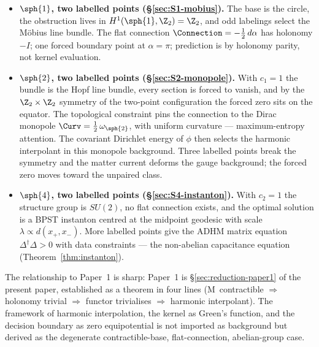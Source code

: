 \begin{itemize}[leftmargin=2em]
\item \textbf{$\sph{1}$, two labelled points (\S\ref{sec:S1-mobius}).}
The base is the circle, the obstruction lives in $H^1(\sph{1},\Z_2)=\Z_2$,
and odd labelings select the M\"obius line bundle. The flat connection
$\Connection = -\tfrac12\,d\alpha$ has holonomy $-I$; one forced
boundary point at $\alpha=\pi$; prediction is by holonomy parity, not
kernel evaluation.

\item \textbf{$\sph{2}$, two labelled points (\S\ref{sec:S2-monopole}).}
With $c_1=1$ the bundle is the Hopf line bundle, every section is
forced to vanish, and by the $\Z_2\times\Z_2$ symmetry of the
two-point configuration the forced zero sits on the equator. The
topological constraint pins the connection to the Dirac monopole
$\Curv = \tfrac12\,\omega_{\sph{2}}$, with uniform curvature ---
maximum-entropy attention. The covariant Dirichlet energy of $\phi$
then selects the harmonic interpolant in this monopole background.
Three labelled points break the symmetry and the matter current
deforms the gauge background; the forced zero moves toward the
unpaired class.

\item \textbf{$\sph{4}$, two labelled points (\S\ref{sec:S4-instanton}).}
With $c_2=1$ the structure group is $SU(2)$, no flat connection
exists, and the optimal solution is a BPST instanton centred at the
midpoint geodesic with scale $\lambda\propto d(x_+,x_-)$. More labelled
points give the ADHM matrix equation $\Delta^\dagger\Delta>0$ with
data constraints --- the non-abelian capacitance equation
(Theorem~\ref{thm:instanton}).
\end{itemize}

The relationship to Paper~1 is sharp: Paper~1 is
\S\ref{sec:reduction-paper1} of the present paper, established as a
theorem in four lines (M~contractible $\Rightarrow$ holonomy trivial
$\Rightarrow$ functor trivialises $\Rightarrow$ harmonic interpolant).
The framework of harmonic interpolation, the kernel as Green's
function, and the decision boundary as zero equipotential is not
imported as background but derived as the degenerate
contractible-base, flat-connection, abelian-group case.

